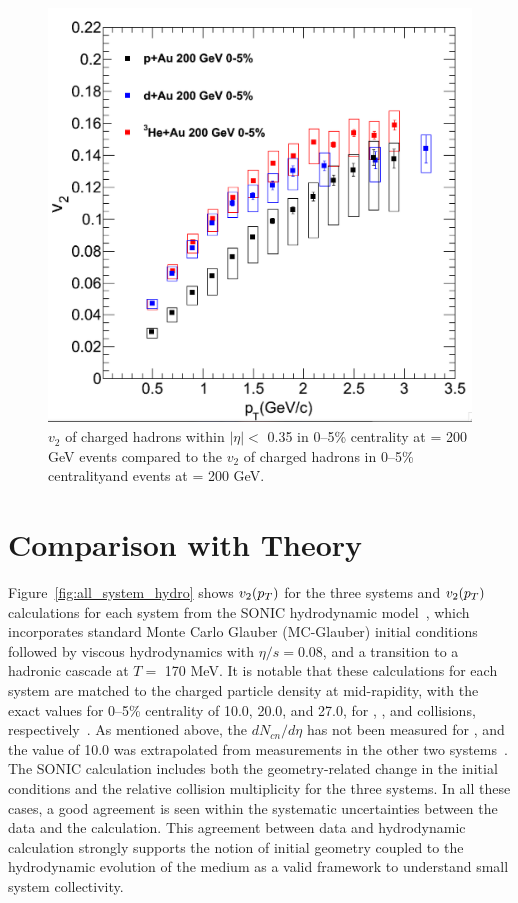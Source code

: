 \begin{figure}[!ht]
\begin{center}
\includegraphics[width=0.65\linewidth]{figs/v2_3_sys_compare_nohydro.png}
\caption{$v_2$ of charged hadrons within $|\eta| <$ 0.35 in 0--5\% centrality \pau at \sqsn = 200 GeV events compared to the $v_2$ of charged hadrons in 0--5\% centrality\dau and \hau events at \sqsn = 200 GeV.}
\label{fig:v2_3_sys_compare_nohydro}
\end{center}
\end{figure}

\section{Comparison with Theory}
Figure~\ref{fig:all_system_hydro} shows $v_2(\mbox{$p_T$})$ for the three systems and $v_2(\mbox{$p_T$})$ calculations for each system from the SONIC hydrodynamic model~\cite{Habich:2014jna}, which incorporates standard Monte Carlo Glauber (MC-Glauber) initial conditions followed by viscous hydrodynamics with $\eta/s=0.08$, and a transition to a hadronic cascade at $T=$ 170 MeV. It is notable that these calculations for each system are matched to the charged particle density at mid-rapidity, with the exact values for 0--5\% centrality of 10.0, 20.0, and 27.0, for \pau, \dau, and \hau collisions, respectively~\cite{Habich:2014jna}. As mentioned above, the $dN_{cn}/d\eta$ has not been measured for \pau, and the value of 10.0 was extrapolated from measurements in the other two systems~\cite{Habich:2014jna}. The SONIC calculation includes both the geometry-related change in the initial conditions and the relative collision multiplicity for the three systems. In all these cases, a good agreement is seen within the systematic uncertainties between the data and the calculation. This agreement between data and hydrodynamic calculation strongly supports the notion of initial geometry coupled to the hydrodynamic evolution of the medium as a valid framework to understand small system collectivity.

